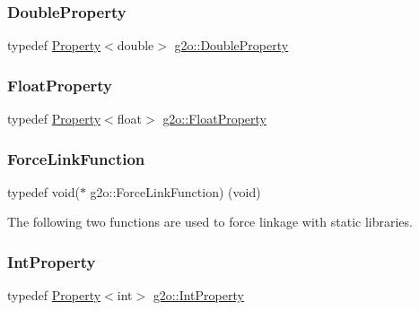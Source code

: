 \mbox{\label{namespaceg2o_a9b4e25cbdaf9d69afa4431d6af6d7bed}} 
\subsubsection{\texorpdfstring{Double\+Property}{DoubleProperty}}
{\footnotesize\ttfamily typedef \mbox{\hyperlink{classg2o_1_1_property}{Property}}$<$double$>$ \mbox{\hyperlink{namespaceg2o_a9b4e25cbdaf9d69afa4431d6af6d7bed}{g2o\+::\+Double\+Property}}}

\mbox{\label{namespaceg2o_af8e55b06b00e915fcf0475b00acea270}} 
\subsubsection{\texorpdfstring{Float\+Property}{FloatProperty}}
{\footnotesize\ttfamily typedef \mbox{\hyperlink{classg2o_1_1_property}{Property}}$<$float$>$ \mbox{\hyperlink{namespaceg2o_af8e55b06b00e915fcf0475b00acea270}{g2o\+::\+Float\+Property}}}

\mbox{\label{namespaceg2o_a3be76fea59d320255e89425439f18f48}} 
\subsubsection{\texorpdfstring{Force\+Link\+Function}{ForceLinkFunction}}
{\footnotesize\ttfamily typedef void($\ast$  g2o\+::\+Force\+Link\+Function) (void)}

The following two functions are used to force linkage with static libraries. \mbox{\label{namespaceg2o_aa44e64803eabdb592175e27f1e3ebf59}} 
\subsubsection{\texorpdfstring{Int\+Property}{IntProperty}}
{\footnotesize\ttfamily typedef \mbox{\hyperlink{classg2o_1_1_property}{Property}}$<$int$>$ \mbox{\hyperlink{namespaceg2o_aa44e64803eabdb592175e27f1e3ebf59}{g2o\+::\+Int\+Property}}}

